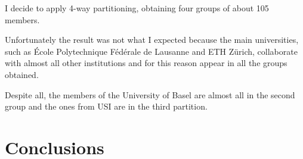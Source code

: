 \documentclass[]{usiinfbachelorproject}
\begin{document}
I decide to apply 4-way partitioning, obtaining four groups of about 105 members.

Unfortunately the result was not what I expected because the main universities, such as \'{E}cole Polytechnique F\'{e}d\'{e}rale de Lausanne and ETH Z\"{u}rich, collaborate with almost all other institutions and for this reason appear in all the groups obtained.  

Despite all, the members of the University of Basel are almost all in the second group and the ones from USI are in the third partition.







\section{Conclusions} \label{sec:conclusions}


\newpage


\end{document}
